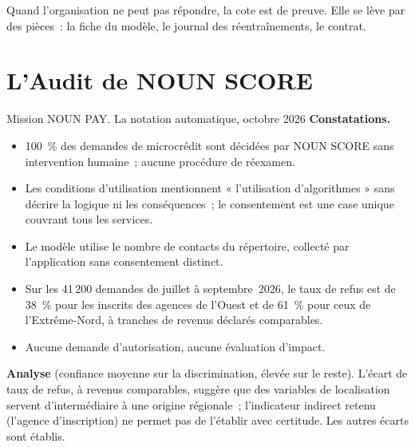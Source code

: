 Quand l'organisation ne peut pas répondre, la cote est \NEK{} de preuve.
Elle se lève par des pièces~: la fiche du modèle, le journal des
réentraînements, le contrat.

\section{L'Audit de NOUN SCORE}
\label{sec:c14-nounpay}

\begin{boxscenario}{Mission NOUN PAY. La notation automatique, octobre 2026}
\textbf{Constatations.}
\begin{itemize}
    \item 100~\% des demandes de microcrédit sont décidées par NOUN SCORE
          sans intervention humaine~; aucune procédure de réexamen.
    \item Les conditions d'utilisation mentionnent « l'utilisation
          d'algorithmes » sans décrire la logique ni les conséquences~; le
          consentement est une case unique couvrant tous les services.
    \item Le modèle utilise le nombre de contacts du répertoire, collecté
          par l'application sans consentement distinct.
    \item Sur les 41\,200 demandes de juillet à septembre~2026, le taux de
          refus est de 38~\% pour les inscrits des agences de l'Ouest et de
          61~\% pour ceux de l'Extrême-Nord, à tranches de revenus déclarés
          comparables.
    \item Aucune demande d'autorisation, aucune évaluation d'impact.
\end{itemize}

\textbf{Analyse} (confiance moyenne sur la discrimination, élevée sur le
reste). L'écart de taux de refus, à revenus comparables, suggère que des
variables de localisation servent d'intermédiaire à une origine
régionale~; l'indicateur indirect retenu (l'agence d'inscription) ne permet
pas de l'établir avec certitude. Les autres écarts sont établis.
\end{boxscenario}

